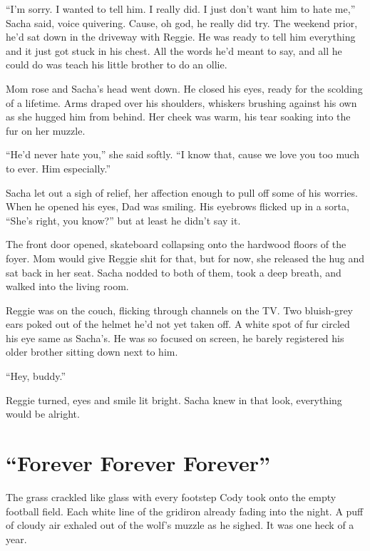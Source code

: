 ``I'm sorry. I wanted to tell him. I really did. I just
don't want him to hate me,'' Sacha said, voice quivering. Cause, oh god,
he really did try. The weekend prior, he'd sat down in the driveway with
Reggie. He was ready to tell him everything and it just got stuck in his
chest. All the words he'd meant to say, and all he could do was teach
his little brother to do an
ollie.

Mom rose and Sacha's head went down. He closed his eyes,
ready for the scolding of a lifetime. Arms draped over his shoulders,
whiskers brushing against his own as she hugged him from behind. Her
cheek was warm, his tear soaking into the fur on her
muzzle.

``He'd never hate you,'' she said softly. ``I know that,
cause we love you too much to ever. Him
especially.''

Sacha let out a sigh of relief, her affection enough to pull
off some of his worries. When he opened his eyes, Dad was smiling. His
eyebrows flicked up in a sorta, ``She's right, you know?'' but at least
he didn't say
it.

The front door opened, skateboard collapsing onto the
hardwood floors of the foyer. Mom would give Reggie shit for that, but
for now, she released the hug and sat back in her seat. Sacha nodded to
both of them, took a deep breath, and walked into the living
room.

Reggie was on the couch, flicking through channels on the
TV. Two bluish-grey ears poked out of the helmet he'd not yet taken off.
A white spot of fur circled his eye same as Sacha's. He was so focused
on screen, he barely registered his older brother sitting down next to
him.

``Hey, buddy.''

Reggie turned, eyes and smile lit bright. Sacha knew in that
look, everything would be
alright.


\chapter*{``Forever Forever Forever''}

The grass crackled like glass with every footstep Cody took onto the
empty football field. Each white line of the gridiron already fading
into the night. A puff of cloudy air exhaled out of the wolf's muzzle as
he sighed. It was one heck of a year.

